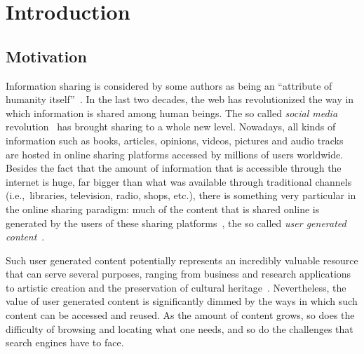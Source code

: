 
\chapter{Introduction}
\label{sec:intro}

\section{Motivation}
\label{sec:intro:motivation}

Information sharing is considered by some authors as being an ``attribute of humanity itself''~\citep{Dunbar1996,Rafaeli2005}.
In the last two decades, the web has revolutionized the way in which information is shared among human beings.
The so called \emph{social media} revolution~\citep{Smith2009} has brought sharing to a whole new level. 
Nowadays, all kinds of information such as books, articles, opinions, videos, pictures and audio tracks are hosted in online sharing platforms accessed by millions of users worldwide.
Besides the fact that the amount of information that is accessible through the internet is huge, far bigger than what was available through traditional channels (i.e.,~libraries, television, radio, shops, etc.), there is something very particular in the online sharing paradigm:
much of the content that is shared online is generated by the users of these sharing platforms~\citep{Kietzmann2011}, the so called \emph{user generated content}~\citep{Kaplan2010}.

Such user generated content potentially represents an incredibly valuable resource that can serve several purposes, ranging from business and research applications to artistic creation and the preservation of cultural heritage~\citep{Krumm2008}. 
Nevertheless, the value of user generated content is significantly dimmed by the ways in which such content can be accessed and reused.
As the amount of content grows, so does the difficulty of browsing and locating what one needs, and so do the challenges that search engines have to face.%

